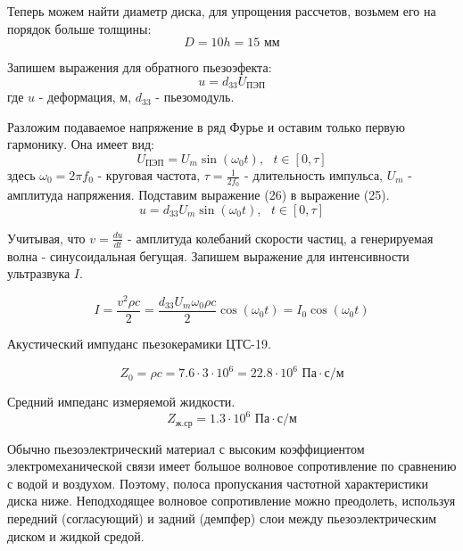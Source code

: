 \documentclass[russian, utf8, 12pt]{eskdtext}
\begin{document}
Теперь можем найти диаметр диска, для упрощения рассчетов, возьмем его на порядок больше толщины:
\begin{equation}
	D = 10h = 15 \text{ мм}
\end{equation}

Запишем выражения для обратного пьезоэфекта:
\begin{equation}
	u = d_{33} U_\text{ПЭП}
\end{equation}
где $u$ - деформация, м, $d_{33}$ - пьезомодуль.

Разложим подаваемое напряжение в ряд Фурье и оставим только первую гармонику. Она имеет вид: 
\begin{equation}
	U_\text{ПЭП} = U_m \sin{(\omega_0 t)}, \text{    } t \in [0, \tau]
\end{equation}
здесь $\omega_0 = 2 \pi f_0$ - круговая частота, $\tau = \displaystyle\frac{1}{2f_0}$ - длительность импульса, $U_m$ - амплитуда напряжения. Подставим выражение (26) в выражение (25).
\begin{equation}
	u = d_{33}U_m\sin{(\omega_0 t)}, \text{    } t \in [0, \tau] 
\end{equation}

Учитывая, что $v = \frac{du}{dt}$ - амплитуда колебаний скорости частиц, а генерируемая волна - синусоидальная бегущая. Запишем выражение для интенсивности ультразвука $I$.

\begin{equation}
	I = \frac{v^2 \rho c}{2} = \frac{d_{33} U_m \omega_0 \rho c}{2} \cos{(\omega_0 t)} = I_0 \cos{(\omega_0 t)}
\end{equation}

Акустический импуданс пьезокерамики ЦТС-19.

\begin{equation}
	Z_\text{0} = \rho c = 7.6 \cdot 3 \cdot 10^6 = 22.8 \cdot 10^6 \text{ Па}\cdot\text{с/м}
\end{equation}

Средний импеданс измеряемой жидкости.
\begin{equation}
	Z_\text{ж.ср} = 1.3 \cdot 10^6 \text{ Па}\cdot\text{с/м}
\end{equation}

Обычно пьезоэлектрический материал с высоким коэффициентом электромеханической связи имеет большое волновое сопротивление по сравнению с водой и воздухом. Поэтому, полоса пропускания частотной характеристики диска ниже. Неподходящее волновое сопротивление можно преодолеть, используя передний (согласующий) и задний (демпфер) слои между пьезоэлектрическим диском и жидкой средой. \par
\end{document}
